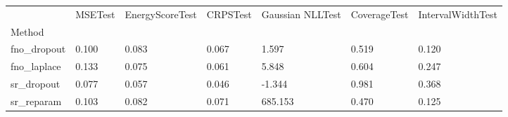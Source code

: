 \begin{tabular}{lllllll}
\toprule
 & MSETest & EnergyScoreTest & CRPSTest & Gaussian NLLTest & CoverageTest & IntervalWidthTest \\
Method &  &  &  &  &  &  \\
\midrule
fno_dropout & 0.100 & 0.083 & 0.067 & 1.597 & 0.519 & 0.120 \\
fno_laplace & 0.133 & 0.075 & 0.061 & 5.848 & 0.604 & 0.247 \\
sr_dropout & 0.077 & 0.057 & 0.046 & -1.344 & 0.981 & 0.368 \\
sr_reparam & 0.103 & 0.082 & 0.071 & 685.153 & 0.470 & 0.125 \\
\bottomrule
\end{tabular}
